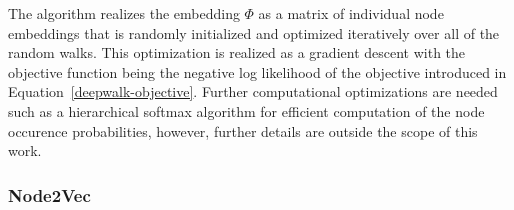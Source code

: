 The algorithm realizes the embedding \( \Phi \) as a matrix of individual node embeddings that is randomly initialized and optimized iteratively over all of the random walks. This optimization is realized as a gradient descent with the objective function being the negative log likelihood of the objective introduced in Equation~\ref{deepwalk-objective}. Further computational optimizations are needed such as a hierarchical softmax algorithm for efficient computation of the node occurence probabilities, however, further details are outside the scope of this work.

\subsubsection{Node2Vec}
